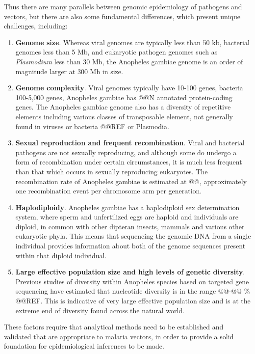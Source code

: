 \documentclass[a4paper,11pt,abstracton,hidelinks]{scrartcl}
\begin{document}
Thus there are many parallels between genomic epidemiology of pathogens and vectors, but there are also some fundamental differences, which present unique challenges, including:
%
\begin{enumerate}
%
\item \textbf{Genome size}.
%
Whereas viral genomes are typically less than 50 kb, bacterial genomes less than 5 Mb, and eukaryotic pathogen genomes such as \textit{Plasmodium} less than 30 Mb, the Anopheles gambiae genome is an order of magnitude larger at 300 Mb in size.
%
\item \textbf{Genome complexity}.
%
Viral genomes typically have 10-100 genes, bacteria 100-5,000 genes, Anopheles gambiae has @@N annotated protein-coding genes.
%
The Anopheles gambiae genome also has a diversity of repetitive elements including various classes of transposable element, not generally found in viruses or bacteria @@REF or Plasmodia.
%
\item \textbf{Sexual reproduction and frequent recombination}.
%
Viral and bacterial pathogens are not sexually reproducing, and although some do undergo a form of recombination under certain circumstances, it is much less frequent than that which occurs in sexually reproducing eukaryotes. The recombination rate of Anopheles gambiae is estimated at @@, approximately one recombination event per chromosome arm per generation.
%
\item \textbf{Haplodiploidy}. 
%
Anopheles gambiae has a haplodiploid sex determination system, where sperm and unfertilized eggs are haploid and individuals are diploid, in common with other dipteran insects, mammals and various other eukaryotic phyla.
%
This means that sequencing the genomic DNA from a single individual provides information about both of the genome sequences present within that diploid individual.
%
\item \textbf{Large effective population size and high levels of genetic diversity}.
%
Previous studies of diversity within Anopheles species based on targeted gene sequencing have estimated that nucleotide diversity is in the range @@-@@ \% @@REF.
%
This is indicative of very large effective population size and is at the extreme end of diversity found across the natural world.
%
\end{enumerate}
%
These factors require that analytical methods need to be established and validated that are appropriate to malaria vectors, in order to provide a solid foundation for epidemiological inferences to be made.
\end{document}
